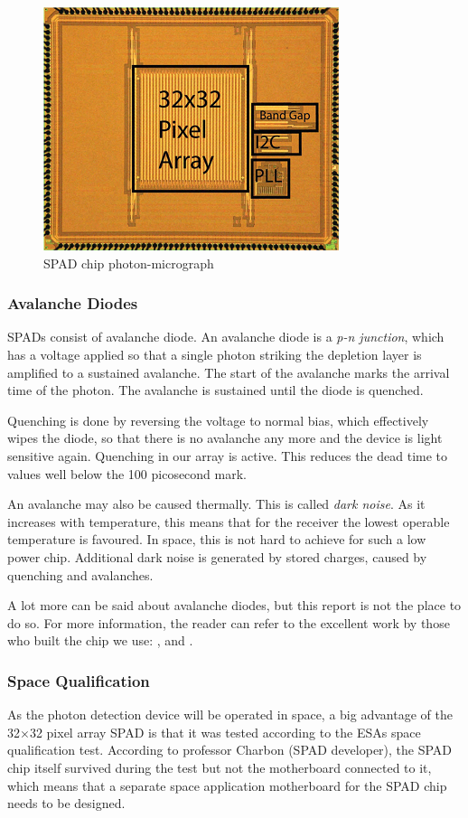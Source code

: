 \begin{figure}[ht!]
\centering
\includegraphics[scale = 0.8]{chapters/img/32by32array.png}
\caption{\acs{SPAD} chip photon-micrograph}
\label{fig:spad_overview}
\end{figure} 

\subsubsection{Avalanche Diodes}
\label{diodes}	
\aclp{SPAD} consist of avalanche diode. An avalanche diode is a \textit{p-n junction}, which has a voltage applied so that a single photon striking the depletion layer is amplified to a sustained avalanche. The start of the avalanche marks the arrival time of the photon. The avalanche is sustained until the diode is quenched.

Quenching is done by reversing the voltage to normal bias, which effectively wipes the diode, so that there is no avalanche any more and the device is light sensitive again. Quenching in our array is active. This reduces the dead time to values well below the 100 picosecond mark.

An avalanche may also be caused thermally. This is called \textit{dark noise}. As it increases with temperature, this means that for the receiver the lowest operable temperature is favoured. In space, this is not hard to achieve for such a low power chip. Additional dark noise is generated by stored charges, caused by quenching and avalanches.

A lot more can be said about avalanche diodes, but this report is not the place to do so. For more information, the reader can refer to the excellent work by those who built the chip we use: \cite{SPAD}, \cite{SPAD2} and \cite{SPAD3}.

\subsubsection{Space Qualification}
\label{SQ}
As the photon detection device will be operated in space, a big advantage of the 32$\times$32 pixel array \ac{SPAD} is that it was tested according to the \acsp{ESA} space qualification test. According to professor Charbon (\ac{SPAD} developer), the \ac{SPAD} chip itself survived during the test but not the motherboard connected to it, which means that a separate space application motherboard for the \ac{SPAD} chip needs to be designed.


